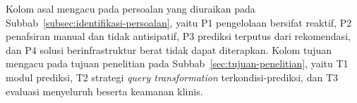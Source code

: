 \noindent\footnotesize Kolom asal mengacu pada persoalan yang diuraikan pada Subbab~\ref{subsec:identifikasi-persoalan}, yaitu P1 pengelolaan bersifat reaktif, P2 penafsiran manual dan tidak antisipatif, P3 prediksi terputus dari rekomendasi, dan P4 solusi berinfrastruktur berat tidak dapat diterapkan. Kolom tujuan mengacu pada tujuan penelitian pada Subbab~\ref{sec:tujuan-penelitian}, yaitu T1 modul prediksi, T2 strategi \emph{query transformation} terkondisi-prediksi, dan T3 evaluasi menyeluruh beserta keamanan klinis.\normalsize
